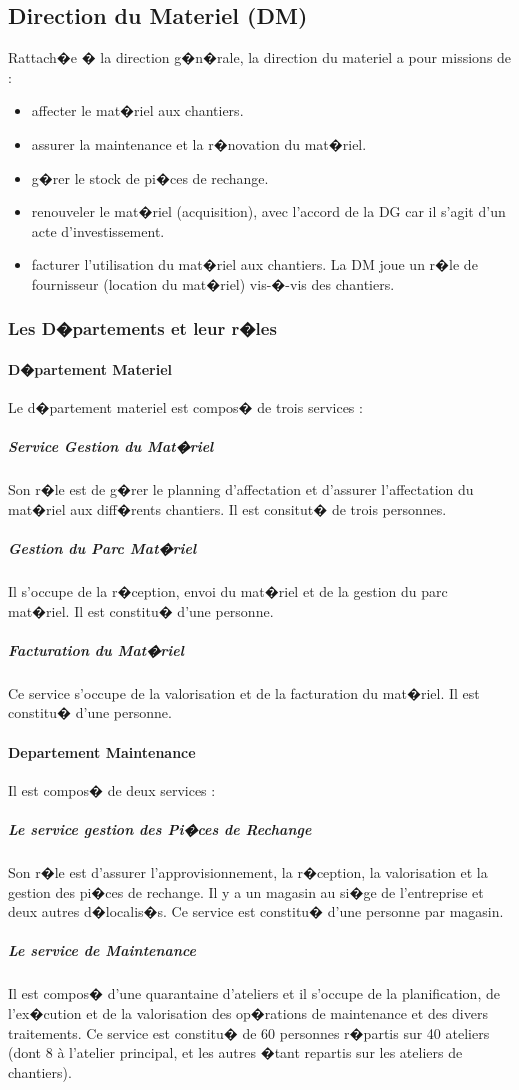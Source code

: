 \documentclass{article}
\begin{document}
    \subsection{Direction du Materiel (DM)}
            Rattach�e � la direction g�n�rale, la direction du materiel a pour missions de :
            \begin{itemize}
                \item affecter le mat�riel aux chantiers.
                \item assurer la maintenance et la r�novation du mat�riel.
                \item g�rer le stock de pi�ces de rechange.
                \item renouveler le mat�riel (acquisition), avec l'accord de la DG car il s'agit d'un acte d'investissement.
                \item facturer l'utilisation du mat�riel aux chantiers. La DM joue un r�le de fournisseur (location du mat�riel) vis-�-vis des chantiers.
            \end{itemize}
            
        \subsubsection{Les D�partements et leur r�les}
            \paragraph{D�partement Materiel}
                Le d�partement materiel est compos� de trois services :
                \subparagraph{Service Gestion du Mat�riel}
                    Son r�le est de g�rer le planning d'affectation et d'assurer l'affectation du mat�riel aux diff�rents chantiers. Il est consitut� de trois personnes.
                \subparagraph{Gestion du Parc Mat�riel}
                    Il s'occupe de la r�ception, envoi du mat�riel et de la gestion du parc mat�riel. Il est constitu� d'une personne.
                \subparagraph{Facturation du Mat�riel}
                    Ce service s'occupe de la valorisation et de la facturation du mat�riel. Il est constitu� d'une personne.        
                
            \paragraph{Departement Maintenance}
                Il est compos� de deux services :
                \subparagraph{Le service gestion des Pi�ces de Rechange}
                    Son r�le est d'assurer l'approvisionnement, la r�ception, la valorisation et la gestion des pi�ces   de rechange. Il y a un magasin au si�ge de l'entreprise et deux autres d�localis�s. Ce service est constitu� d'une personne par magasin. 
                \subparagraph{Le service de Maintenance}
                    Il est compos� d'une quarantaine d'ateliers et il s'occupe de la planification, de l'ex�cution et de la valorisation des op�rations de maintenance et des divers traitements. Ce service est constitu� de 60 personnes r�partis sur 40 ateliers (dont 8 à l'atelier principal, et les autres �tant repartis sur les ateliers de chantiers).
\end{document}
